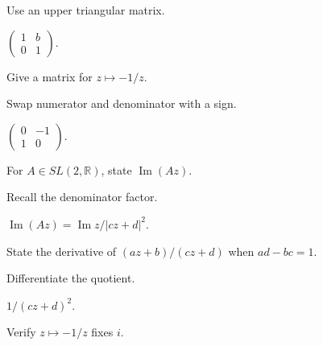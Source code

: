 \begin{hint}
Use an upper triangular matrix.
\end{hint}

\begin{solution}
\(\begin{pmatrix}1&b\\0&1\end{pmatrix}\).
\end{solution}

\begin{exercise}\label{exr:vii33-ped-02}
Give a matrix for \(z\mapsto-1/z\).
\end{exercise}

\begin{hint}
Swap numerator and denominator with a sign.
\end{hint}

\begin{solution}
\(\begin{pmatrix}0&-1\\1&0\end{pmatrix}\).
\end{solution}

\begin{exercise}\label{exr:vii33-ped-03}
For \(A\in SL(2,\mathbb R)\), state \(\operatorname{Im}(Az)\).
\end{exercise}

\begin{hint}
Recall the denominator factor.
\end{hint}

\begin{solution}
\(\operatorname{Im}(Az)=\operatorname{Im}z/|cz+d|^2\).
\end{solution}

\begin{exercise}[Derivative]\label{exr:vii33-ped-04}
State the derivative of \((az+b)/(cz+d)\) when \(ad-bc=1\).
\end{exercise}

\begin{hint}
Differentiate the quotient.
\end{hint}

\begin{solution}
\(1/(cz+d)^2\).
\end{solution}

\begin{exercise}\label{exr:vii33-ped-05}
Verify \(z\mapsto-1/z\) fixes \(i\).
\end{exercise}

